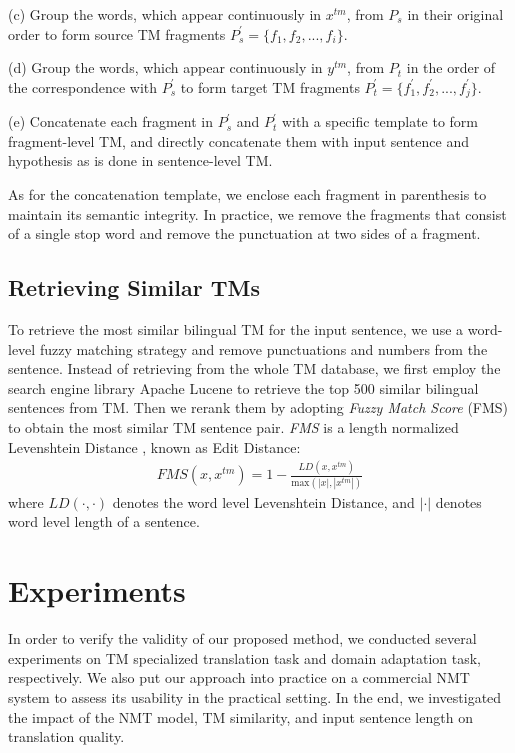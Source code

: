 \documentclass[letterpaper]{article} %
\begin{document}
(c) Group the words, which appear continuously in $x^{tm}$, from $P_s$ in their original order to form source TM fragments $P^\prime_s = \{f_1,f_2,...,f_i\}$.

(d) Group the words, which appear continuously in $y^{tm}$, from $P_t$ in the order of the correspondence with $P^\prime_s$ to form target TM fragments $P^\prime_t = \{f^\prime_1,f^\prime_2,...,f^\prime_j\}$.

(e) Concatenate each fragment in $P^\prime_s$ and $P^\prime_t$ with a specific template to form fragment-level TM, and directly concatenate them with input sentence and hypothesis as is done in sentence-level TM.

As for the concatenation template, we enclose each fragment in parenthesis to maintain its semantic integrity. In practice, we remove the fragments that consist of a single stop word and remove the punctuation at two sides of a fragment.

\subsection{Retrieving Similar TMs}

To retrieve the most similar bilingual TM for the input sentence, we use a word-level fuzzy matching strategy and remove punctuations and numbers from the sentence. Instead of retrieving from the whole TM database, we first employ the search engine library Apache Lucene \cite{bialecki2012apache} to retrieve the top 500 similar bilingual sentences from TM. Then we rerank them by adopting \emph{Fuzzy Match Score} (FMS) to obtain the most similar TM sentence pair. \emph{FMS} is a length normalized Levenshtein Distance \cite{yujian2007normalized}, known as Edit Distance:
\begin{eqnarray}
FMS(x,x^{tm})=1-\frac{LD(x,x^{tm})}{\textrm{max}(|x|,|x^{tm}|)}
\end{eqnarray}
where $LD(\cdot,\cdot)$ denotes the word level Levenshtein Distance, and $|\cdot|$ denotes word level length of a sentence.

\section{Experiments}

In order to verify the validity of our proposed method, we conducted several experiments on TM specialized translation task and domain adaptation task, respectively. We also put our approach into practice on a commercial NMT system to assess its usability in the practical setting. In the end, we investigated the impact of the NMT model, TM similarity, and input sentence length on translation quality.
\end{document}
